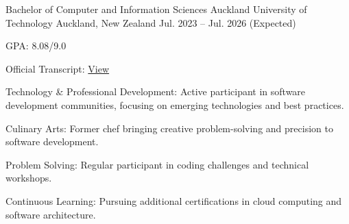 \documentclass[11pt, a4paper]{awesome-cv}
\begin{document}
\begin{cventries}
  \cventry
    {Bachelor of Computer and Information Sciences} %
    {Auckland University of Technology} %
    {Auckland, New Zealand} %
    {Jul. 2023 -- Jul. 2026 (Expected)} %
    {
      \begin{cvitems}
        \item {GPA: 8.08/9.0}
        \item {Official Transcript: \href{https://www.myequals.net/r/sharelink/fc37c3dd-0108-419f-a8d8-dc283c6f5c11/4c3d3151-ccbb-4515-b0f2-98a437ee2f60}{View} }
      \end{cvitems}
    }
\end{cventries}

\begin{cvskills}
\end{cvskills}

\begin{cvhonors}
\end{cvhonors}

\begin{cvitems}
  \item {Technology \& Professional Development: Active participant in software development communities, focusing on emerging technologies and best practices.}
  \item {Culinary Arts: Former chef bringing creative problem-solving and precision to software development.}
  \item {Problem Solving: Regular participant in coding challenges and technical workshops.}
  \item {Continuous Learning: Pursuing additional certifications in cloud computing and software architecture.}
\end{cvitems}
\end{document}
